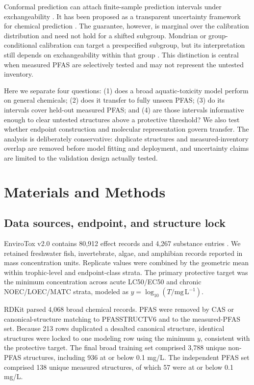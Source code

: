\documentclass[journal=esthag,manuscript=article,margin=1in]{achemso}
\begin{document}
Conformal prediction can attach finite-sample prediction intervals under exchangeability \cite{vovk2005algorithmic,shafer2008tutorial,angelopoulos2023gentle}. It has been proposed as a transparent uncertainty framework for chemical prediction \cite{norinder2014conformal}. The guarantee, however, is marginal over the calibration distribution and need not hold for a shifted subgroup. Mondrian or group-conditional calibration can target a prespecified subgroup, but its interpretation still depends on exchangeability within that group \cite{vovk2012conditional}. This distinction is central when measured PFAS are selectively tested and may not represent the untested inventory.

Here we separate four questions: (1) does a broad aquatic-toxicity model perform on general chemicals; (2) does it transfer to fully unseen PFAS; (3) do its intervals cover held-out measured PFAS; and (4) are those intervals informative enough to clear untested structures above a protective threshold? We also test whether endpoint construction and molecular representation govern transfer. The analysis is deliberately conservative: duplicate structures and measured-inventory overlap are removed before model fitting and deployment, and uncertainty claims are limited to the validation design actually tested.

\section{Materials and Methods}

\subsection{Data sources, endpoint, and structure lock}

EnviroTox v2.0 contains 80,912 effect records and 4,267 substance entries \cite{connors2019envirotox}. We retained freshwater fish, invertebrate, algae, and amphibian records reported in mass concentration units. Replicate values were combined by the geometric mean within trophic-level and endpoint-class strata. The primary protective target was the minimum concentration across acute LC50/EC50 and chronic NOEC/LOEC/MATC strata, modeled as $y=\log_{10}(T/\mathrm{mg\,L^{-1}})$.

RDKit \cite{rdkit} parsed 4,068 broad chemical records. PFAS were removed by CAS or canonical-structure matching to PFASSTRUCTV6 and to the measured-PFAS set. Because 213 rows duplicated a desalted canonical structure, identical structures were locked to one modeling row using the minimum $y$, consistent with the protective target. The final broad training set comprised 3,788 unique non-PFAS structures, including 936 at or below 0.1 mg/L. The independent PFAS set comprised 138 unique measured structures, of which 57 were at or below 0.1 mg/L.
\end{document}
